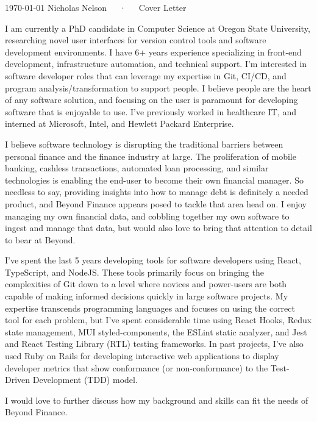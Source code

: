 \documentclass[11pt, a4paper]{awesome-cv}
\newcommand{\company}{Beyond Finance}
\begin{document}
\makecvheader[R]

\makecvfooter
  {\today}
  {Nicholas Nelson~~~·~~~Cover Letter}
  {}

\makelettertitle

\begin{cvletter}

I am currently a PhD candidate in Computer Science at Oregon State University, researching novel user interfaces for version control tools and software development environments. I have 6+ years experience specializing in front-end development, infrastructure automation, and technical support. I'm interested in software developer roles that can leverage my expertise in Git, CI/CD, and program analysis/transformation to support people. I believe people are the heart of any software solution, and focusing on the user is paramount for developing software that is enjoyable  to use. I've previously worked in healthcare IT, and interned at Microsoft, Intel, and Hewlett Packard Enterprise.

\lettersection{Why \company?}
I believe software technology is disrupting the traditional barriers between personal finance and the finance industry at large. 
The proliferation of mobile banking, cashless transactions, automated loan processing, and similar technologies is enabling the end-user to become their own financial manager. So needless to say, providing insights into how to manage debt is definitely a needed product, and Beyond Finance appears posed to tackle that area head on. I enjoy managing my own financial data, and cobbling together my own software to ingest and manage that data, but would also love to bring that attention to detail to bear at Beyond.

I've spent the last 5 years developing tools for software developers using React, TypeScript, and NodeJS. These tools primarily focus on bringing the complexities of Git down to a level where novices and power-users are both capable of making informed decisions quickly in large software projects. My expertise transcends programming languages and focuses on using the correct tool for each problem, but I've spent considerable time using React Hooks, Redux state management, MUI styled-components, the ESLint static analyzer, and Jest and React Testing Library (RTL) testing frameworks. In past projects, I've also used Ruby on Rails for developing interactive web applications to display developer metrics that show conformance (or non-conformance) to the Test-Driven Development (TDD) model.

I would love to further discuss how my background and skills can fit the needs of \company.

\end{cvletter}


\makeletterclosing
\end{document}
